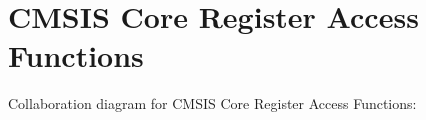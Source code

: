 \hypertarget{group__CMSIS__Core__RegAccFunctions}{}\section{C\+M\+S\+IS Core Register Access Functions}
\label{group__CMSIS__Core__RegAccFunctions}
Collaboration diagram for C\+M\+S\+IS Core Register Access Functions\+:

